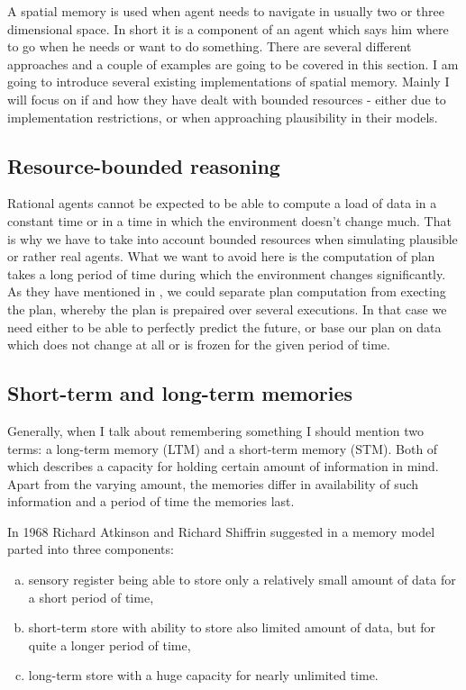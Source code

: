 A spatial memory is used when agent needs to navigate in usually two or three dimensional space. In short it is a component of an agent which says him where to go when he needs or want to do something. There are several different approaches and a couple of examples are going to be covered in this section. I am going to introduce several existing implementations of spatial memory. Mainly I will focus on if and how they have dealt with bounded resources - either due to implementation restrictions, or when approaching plausibility in their models. 

\subsection{Resource-bounded reasoning}

Rational agents cannot be expected to be able to compute a load of data in a constant time or in a time in which the environment doesn't change much. That is why we have to take into account bounded resources when simulating plausible or rather real agents. What we want to avoid here is the computation of plan takes a long period of time during which the environment changes significantly. As they have mentioned in \cite{Bratman:practicalreasoning}, we could separate plan computation from execting the plan, whereby the plan is prepaired over several executions. In that case we need either to be able to perfectly predict the future, or base our plan on data which does not change at all or is frozen for the given period of time.

\subsection{Short-term and long-term memories}

Generally, when I talk about remembering something I should mention two terms: a long-term memory (LTM) and a short-term memory (STM). Both of which describes a capacity for holding certain amount of information in mind. Apart from the varying amount, the memories differ in availability of such information and a period of time the memories last.       

In 1968 Richard Atkinson and Richard Shiffrin suggested in \cite{Atkinson:humanmemory} a memory model parted into three components: 

\begin{enumerate}[(a)]
\item sensory register being able to store only a relatively small amount of data for a short period of time,
\item short-term store with ability to store also limited amount of data, but for quite a longer period of time,
\item long-term store with a huge capacity for nearly unlimited time.
\end{enumerate}

